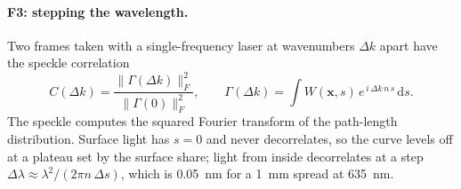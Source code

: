 \documentclass[11pt]{article}
\newcommand{\dd}{\mathrm{d}}
\begin{document}
\paragraph{F3: stepping the wavelength.} Two frames taken with a single-frequency laser at wavenumbers $\Delta k$
apart have the speckle correlation
\begin{equation}
C(\Delta k)=\frac{\|\Gamma(\Delta k)\|_F^2}{\|\Gamma(0)\|_F^2},\qquad
\Gamma(\Delta k)=\int W(\mathbf{x},s)\,e^{\,i\,\Delta k\,n\,s}\,\dd s . \tag{F3}
\end{equation}
The speckle computes the squared Fourier transform of the path-length distribution. Surface light has $s=0$ and
never decorrelates, so the curve levels off at a plateau set by the surface share; light from inside decorrelates at
a step $\Delta\lambda\approx\lambda^2/(2\pi n\,\Delta s)$, which is 0.05~nm for a 1~mm spread at 635~nm.
\end{document}

